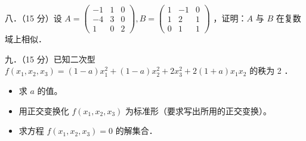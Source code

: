 \documentclass{article}
\begin{document}
八．（15 分）设 \(A=\left(\begin{array}{ccc}-1 & 1 & 0 \\ -4 & 3 & 0 \\ 1 & 0 & 2\end{array}\right), B=\left(\begin{array}{ccc}1 & -1 & 0 \\ 1 & 2 & 1 \\ 0 & 1 & 1\end{array}\right)\) ，证明：\(A\) 与 \(B\) 在复数域上相似．

九．（15 分）已知二次型 \(f\left(x_{1}, x_{2}, x_{3}\right)=(1-a) x_{1}^{2}+(1-a) x_{2}^{2}+2 x_{3}^{2}+2(1+a) x_{1} x_{2}\) 的秩为 2 ．

\begin{itemize}
  \item[（1）] 求 \(a\) 的值。
  \item[（2）] 用正交变换化 \(f\left(x_{1}, x_{2}, x_{3}\right)\) 为标准形（要求写出所用的正交变换）。
  \item[（3）] 求方程 \(f\left(x_{1}, x_{2}, x_{3}\right)=0\) 的解集合．
\end{itemize}
\end{document}
